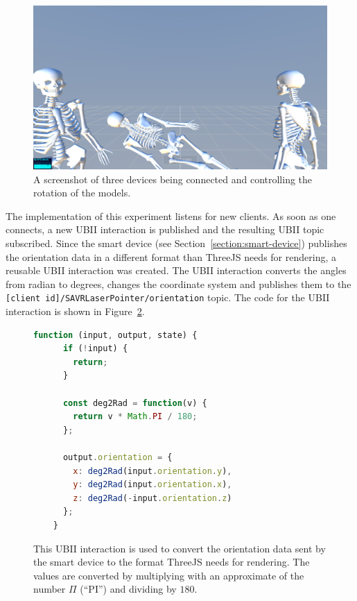 \begin{figure}[H]
  \centering
  \includegraphics[width=12cm]{figures/screenshot_exp_mv.png}
  \caption[Screenshot of the model viewer experiment]{A screenshot of three devices being connected and controlling the rotation of the models.}\label{fig:screenshot-exp-mv}
\end{figure}

The implementation of this experiment listens for new clients. As soon as one connects, a new \ac{UBII} interaction is published and the resulting \ac{UBII} topic subscribed. Since the smart device (see Section~\ref{section:smart-device}) publishes the orientation data in a different format than ThreeJS needs for rendering, a reusable \ac{UBII} interaction was created. The \ac{UBII} interaction converts the angles from radian to degrees, changes the coordinate system and publishes them to the \lstinline[breaklines=false]{[client id]/SAVRLaserPointer/orientation} topic. The code for the \ac{UBII} interaction is shown in Figure~\ref{fig:ubii-interaction-angles}.

\begin{figure}[H]
  \begin{lstlisting}[language=JavaScript]
    function (input, output, state) {
      if (!input) {
        return;
      }

      const deg2Rad = function(v) {
        return v * Math.PI / 180;
      };

      output.orientation = {
        x: deg2Rad(input.orientation.y),
        y: deg2Rad(input.orientation.x),
        z: deg2Rad(-input.orientation.z)
      };
    }
  \end{lstlisting}
  \caption[UBII interaction of model viewer]{This \ac{UBII} interaction is used to convert the orientation data sent by the smart device to the format ThreeJS needs for rendering. The values are converted by multiplying with an approximate of the number $\Pi$ (\enquote{PI}) and dividing by $180$.}\label{fig:ubii-interaction-angles} %
\end{figure}

